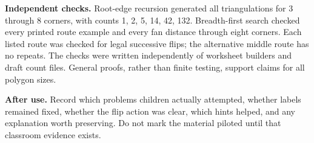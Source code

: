 \documentclass[11pt,letterpaper]{article}
\begin{document}
\textbf{Independent checks.} Root-edge recursion generated all triangulations for 3 through 8 corners, with counts 1, 2, 5, 14, 42, 132. Breadth-first search checked every printed route example and every fan distance through eight corners. Each listed route was checked for legal successive flips; the alternative middle route has no repeats. The checks were written independently of worksheet builders and draft count files. General proofs, rather than finite testing, support claims for all polygon sizes.

\textbf{After use.} Record which problems children actually attempted, whether labels remained fixed, whether the flip action was clear, which hints helped, and any explanation worth preserving. Do not mark the material piloted until that classroom evidence exists.
\end{document}
